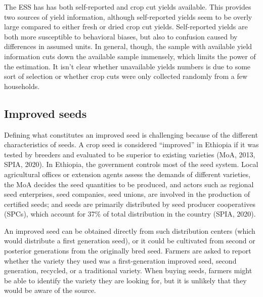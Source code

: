 \documentclass{article}
\begin{document}
{\small\tabcolsep=3pt  %
    
}

The ESS has has both self-reported and crop cut yields available. This provides two sources of yield information, although self-reported yields seem to be overly large compared to either fresh or dried crop cut yields. Self-reported yields are both more susceptible to behavioral biases, but also to confusion caused by differences in assumed units. In general, though, the sample with available yield information cuts down the available sample immensely, which limits the power of the estimation. It isn't clear whether unavailable yields numbers is due to some sort of selection or whether crop cuts were only collected randomly from a few households.

\subsection{Improved seeds}

Defining what constitutes an improved seed is challenging because of the different characteristics of seeds. A crop seed is considered “improved” in Ethiopia if it was tested by breeders and evaluated to be superior to existing varieties (MoA, 2013, SPIA, 2020). In Ethiopia, the government controls most of the seed system. Local agricultural offices or extension agents assess the demands of different varieties, the MoA decides the seed quantities to be produced, and actors such as regional seed enterprises, seed companies, seed unions, are involved in the production of certified seeds; and seeds are primarily distributed by seed producer cooperatives (SPCs), which account for 37\% of total distribution in the country (SPIA, 2020). 

An improved seed can be obtained directly from such distribution centers (which would distribute a first generation seed), or it could be cultivated from second or posterior generations from the originally bred seed. Farmers are asked to report whether the variety they used was a first-generation improved seed, second generation,  recycled, or a traditional variety. When buying seeds, farmers might be able to identify the variety they are looking for, but it is unlikely that they would be aware of the source. 
\end{document}
